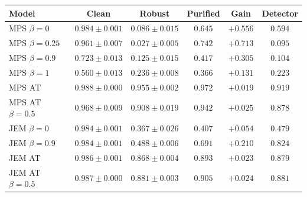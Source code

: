 \begin{tabular}{lccccc}
\toprule
Model & Clean & Robust & Purified & Gain & Detector \\
\midrule
MPS $\beta=0$ & $0.984 \pm 0.001$ & $0.086 \pm 0.015$ & $0.645$ & $+0.556$ & $0.594$ \\
MPS $\beta=0.25$ & $0.961 \pm 0.007$ & $0.027 \pm 0.005$ & $0.742$ & $\mathbf{+0.713}$ & $0.095$ \\
MPS $\beta=0.9$ & $0.723 \pm 0.013$ & $0.125 \pm 0.015$ & $0.417$ & $+0.305$ & $0.104$ \\
MPS $\beta=1$ & $0.560 \pm 0.013$ & $0.236 \pm 0.008$ & $0.366$ & $+0.131$ & $0.223$ \\
MPS AT & $\mathbf{0.988 \pm 0.000}$ & $\mathbf{0.955 \pm 0.002}$ & $\mathbf{0.972}$ & $+0.019$ & $\mathbf{0.919}$ \\
MPS AT $\beta=0.5$ & $0.968 \pm 0.009$ & $0.908 \pm 0.019$ & $0.942$ & $+0.025$ & $0.878$ \\
JEM $\beta=0$ & $0.984 \pm 0.001$ & $0.367 \pm 0.026$ & $0.407$ & $+0.054$ & $0.479$ \\
JEM $\beta=0.9$ & $0.984 \pm 0.001$ & $0.488 \pm 0.006$ & $0.691$ & $+0.210$ & $0.824$ \\
JEM AT & $0.986 \pm 0.001$ & $0.868 \pm 0.004$ & $0.893$ & $+0.023$ & $0.879$ \\
JEM AT $\beta=0.5$ & $0.987 \pm 0.000$ & $0.881 \pm 0.003$ & $0.905$ & $+0.024$ & $0.881$ \\
\bottomrule
\end{tabular}
